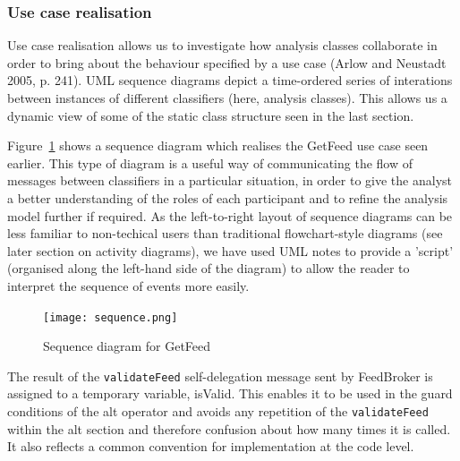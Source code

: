 \documentclass[a4paper]{article}
\begin{document}
\subsubsection{Use case realisation}



Use case realisation allows us to investigate how analysis classes collaborate in order to bring about the behaviour specified by a use case (Arlow and Neustadt 2005, p. 241). UML sequence diagrams depict a time-ordered series of interations between instances of different classifiers (here, analysis classes). This allows us a dynamic view of some of the static class structure seen in the last section.

Figure~\ref{sequence-diagram} shows a sequence diagram which realises the \textsf{GetFeed} use case seen earlier. This type of diagram is a useful way of communicating the flow of messages between classifiers in a particular situation, in order to give the analyst a better understanding of the roles of each participant and to refine the analysis model further if required. As the left-to-right layout of sequence diagrams can be less familiar to non-techical users than traditional flowchart-style diagrams (see later section on activity diagrams), we have used UML notes to provide a 'script' (organised along the left-hand side of the diagram) to allow the reader to interpret the sequence of events more easily.

\begin{figure}
  \begin{center}
    \texttt{[image: sequence.png]}
  \end{center}
  \label{sequence-diagram}
  \caption{Sequence diagram for \textsf{GetFeed}}
\end{figure}

The result of the \texttt{validateFeed} self-delegation message sent by \textsf{FeedBroker} is assigned to a temporary variable, \textsf{isValid}. This enables it to be used in the guard conditions of the \textsf{alt} operator and avoids any repetition of the \texttt{validateFeed} within the \textsf{alt} section and therefore confusion about how many times it is called. It also reflects a common convention for implementation at the code level.
\end{document}
